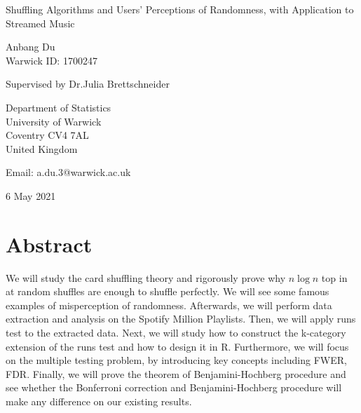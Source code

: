 \documentclass[12pt]{article}
\theoremstyle{plain}
\theoremstyle{definition}
\theoremstyle{remark}
\begin{document}
\thispagestyle{empty}
\begin{center}
{\Huge Shuffling Algorithms and Users’ Perceptions of Randomness, with Application to Streamed Music

\bigskip
\bigskip


\bigskip
\bigskip

\huge Anbang Du\\
\vspace{5pt}
\huge Warwick ID: 1700247\\
\bigskip
\bigskip
\bigskip


\LARGE Supervised by Dr.Julia Brettschneider}
\end{center}
\vfill

\begin{center}
{\Large
Department of Statistics\\
University of Warwick\\
Coventry CV4 7AL\\
United Kingdom\\
\medskip

Email: a.du.3@warwick.ac.uk \\
\medskip

6 May 2021 }
\end{center}
\bigskip

\newpage

\hfill

\hfill

\hfill

\hfill

\section*{Abstract}
We will study the card shuffling theory and rigorously prove why $n\log n$ top in at random shuffles are enough to shuffle perfectly. We will see some famous examples of misperception of randomness. Afterwards, we will perform data extraction and analysis on the Spotify Million Playlists. Then, we will apply runs test to the extracted data. Next, we will study how to construct the k-category extension of the runs test and how to design it in R. Furthermore, we will focus on the multiple testing problem, by introducing key concepts including FWER, FDR. Finally, we will prove the theorem of Benjamini-Hochberg procedure and see whether the Bonferroni correction and Benjamini-Hochberg procedure will make any difference on our existing results.
\end{document}
